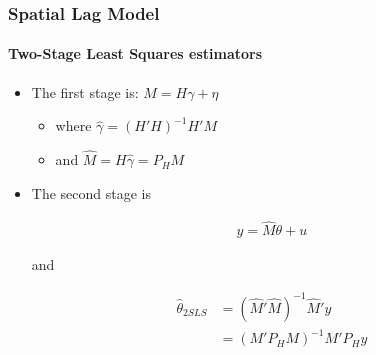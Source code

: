 \documentclass[
  shownotes,
  xcolor={svgnames},
  hyperref={colorlinks,citecolor=DarkBlue,linkcolor=DarkRed,urlcolor=DarkBlue}
  , aspectratio=169]{beamer}
\begin{document}
\begin{frame}[fragile]
\frametitle{Spatial Lag Model}
\framesubtitle{Two-Stage Least Squares estimators}

\begin{itemize}


\item The first stage is: $M=H\gamma+\eta$

\begin{itemize}
  \item where $\hat{\gamma}=(H'H)^{-1}H'M$

  \item and $\hat{M}=H\hat{\gamma}=P_{H}M$
\end{itemize}

\item The second stage is 

\begin{align}
y=\hat{M}\theta+u
\end{align}

and 

\begin{align}
\hat{\theta}_{2SLS}&=(\hat{M}'\hat{M})^{-1}\hat{M}'y \nonumber \\
&=(M'P_{H}M)^{-1}M'P_{H}y
\end{align}

\end{itemize}

\end{frame}
\end{document}
